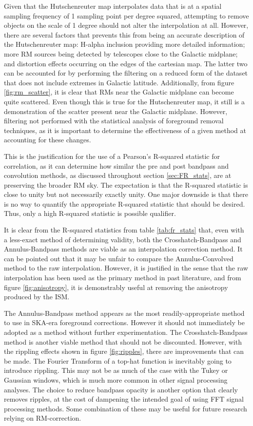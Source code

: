 Given that the Hutschenreuter map interpolates data that is at a spatial sampling frequency of 1 sampling point per degree squared, attempting to remove objects on the scale of 1 degree should not alter the interpolation at all. However, there are several factors that prevents this from being an accurate description of the Hutschenreuter map: H-alpha inclusion providing more detailed information; more RM sources being detected by telescopes close to the Galactic midplane; and distortion effects occurring on the edges of the cartesian map. The latter two can be accounted for by performing the filtering on a reduced form of the dataset that does not include extremes in Galactic latitude. Additionally, from figure \ref{fig:rm_scatter}, it is clear that RMs near the Galactic midplane can become quite scattered. Even though this is true for the Hutschenreuter map, it still is a demonstration of the scatter present near the Galactic midplane. However, filtering not performed with the statistical analysis of foreground removal techniques, as it is important to determine the effectiveness of a given method at accounting for these changes.


This is the justification for the use of a Pearson's R-squared statistic for correlation, as it can determine how similar the pre and post bandpass and convolution methods, as discussed throughout section \ref{sec:FR_stats}, are at preserving the broader RM sky. The expectation is that the R-squared statistic is close to unity but not necessarily exactly unity. One major downside is that there is no way to quantify the appropriate R-squared statistic that should be desired. Thus, only a high R-squared statistic is possible qualifier.


It is clear from the R-squared statistics from table \ref{tab:fr_stats} that, even with a less-exact method of determining validity, both the Crosshatch-Bandpass and Annulus-Bandpass methods are viable as an interpolation correction method. It can be pointed out that it may be unfair to compare the Annulus-Convolved method to the raw interpolation. However, it is justified in the sense that the raw interpolation has been used as the primary method in past literature, and from figure \ref{fig:anisotropy}, it is demonstrably useful at removing the anisotropy produced by the ISM.


The Annulus-Bandpass method appears as the most readily-appropriate method to use in SKA-era foreground corrections. However it should not immediately be adopted as a method without further experimentation. The Crosshatch-Bandpass method is another viable method that should not be discounted. However, with the rippling effects shown in figure \ref{fig:ripples}, there are improvements that can be made. The Fourier Transform of a top-hat function is inevitably going to introduce rippling. This may not be as much of the case with the Tukey or Gaussian windows, which is much more common in other signal processing analyses. The choice to reduce bandpass opacity is another option that clearly removes ripples, at the cost of dampening the intended goal of using FFT signal processing methods. Some combination of these may be useful for future research relying on RM-correction.


